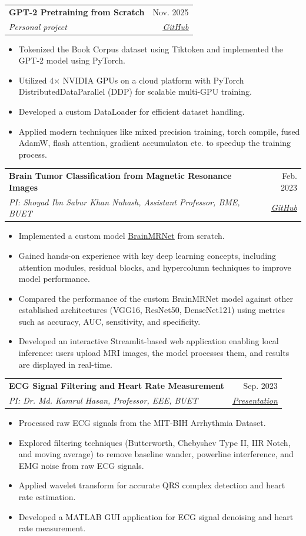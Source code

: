 \documentclass[letterpaper,11pt]{article}
\makeatletter
\newcommand{\resumeItem}[1]{
  \item\small{
    {#1 \vspace{-2pt}}
  }
}
\newcommand{\resumeSubheading}[4]{
  \vspace{-2pt}\item
    \begin{tabular*}{0.97\textwidth}[t]{l@{\extracolsep{\fill}}r}
      \textbf{#1} & #2 \\
      \textit{\small#3} & \textit{\small #4} \\
    \end{tabular*}\vspace{-7pt}
}
\newcommand{\resumeItemListStart}{\begin{itemize}}
\newcommand{\resumeItemListEnd}{\end{itemize}\vspace{-5pt}}
\makeatother
\begin{document}
      \resumeSubheading
          {GPT-2 Pretraining from Scratch}{Nov. 2025}
          {Personal project}
          {\href{https://github.com/Marshal-Ashif-Shawkat/GPT2-multigpu-training}{\underline{GitHub}}}
          \resumeItemListStart
            \resumeItem{Tokenized the Book Corpus dataset using Tiktoken and implemented the GPT-2 model using PyTorch.}
            \resumeItem{Utilized 4× NVIDIA GPUs on a cloud platform with PyTorch DistributedDataParallel (DDP) for scalable multi-GPU training.}
            \resumeItem{Developed a custom DataLoader for efficient dataset handling.}
            \resumeItem{Applied modern techniques like mixed precision training, torch compile, fused AdamW, flash attention, gradient accumulaton etc. to speedup the training process.}
          \resumeItemListEnd
      
      \resumeSubheading
          {Brain Tumor Classification from Magnetic Resonance Images}{Feb. 2023}
          {PI: Shoyad Ibn Sabur Khan Nuhash, Assistant Professor, BME, BUET}
          {\href{https://github.com/Marshal-Ashif-Shawkat/bme-310-project}{\underline{GitHub}}}
          \resumeItemListStart
            \resumeItem{Implemented a custom model \href{https://www.sciencedirect.com/science/article/abs/pii/S0306987719313416}{\underline{BrainMRNet}} from scratch.}
            \resumeItem{Gained hands-on experience with key deep learning concepts, including attention modules, residual blocks, and hypercolumn techniques to improve model performance.}
            \resumeItem{Compared the performance of the custom BrainMRNet model against other established architectures (VGG16, ResNet50, DenseNet121) using metrics such as accuracy, AUC, sensitivity, and specificity.}
            \resumeItem{Developed an interactive Streamlit-based web application enabling local inference: users upload MRI images, the model processes them, and results are displayed in real-time.}
          \resumeItemListEnd

        \resumeSubheading
          {ECG Signal Filtering and Heart Rate Measurement}
          {Sep. 2023}
          {PI: Dr. Md. Kamrul Hasan, Professor, EEE, BUET}
          {\href{https://docs.google.com/presentation/d/1VpT7S1HJMHFJr0GzRC9BqJGJsqcuM625PR_l4NaNybw/edit?usp=sharing}{\underline{Presentation}}}
          \resumeItemListStart
            \resumeItem{Processed raw ECG signals from the MIT-BIH Arrhythmia Dataset.}
            \resumeItem{Explored filtering techniques (Butterworth, Chebyshev Type II, IIR Notch, and moving average) to remove baseline wander, powerline interference, and EMG noise from raw ECG signals.}
            \resumeItem{Applied wavelet transform for accurate QRS complex detection and heart rate estimation.}
            \resumeItem{Developed a MATLAB GUI application for ECG signal denoising and heart rate measurement.}
          \resumeItemListEnd
\end{document}
